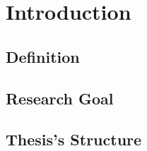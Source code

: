 
\chapter{Introduction} %

\label{Chapter1} %


\section{Definition}

\section{Research Goal}

\section{Thesis's Structure}
